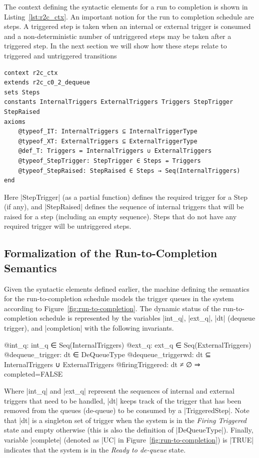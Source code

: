 The context defining the syntactic elements for a run to completion is shown in Listing~\ref{lst:r2c_ctx}. 
An important notion for the run to completion schedule are steps.  
A triggered  step is taken when an internal or external trigger is consumed and a non-deterministic number of untriggered steps may be taken after a triggered step. 
In the next section we will show how these steps relate to triggered and untriggered transitions  

\begin{lstlisting}[language=Event-B, caption = {Context for Run-to-Completion Semantics}, label = {lst:r2c_ctx}]
context r2c_ctx
extends r2c_c0_2_dequeue 
sets Steps
constants InternalTriggers ExternalTriggers Triggers StepTrigger StepRaised
axioms
	@typeof_IT: InternalTriggers ⊆ InternalTriggerType
	@typeof_XT: ExternalTriggers ⊆ ExternalTriggerType
	@def_T: Triggers = InternalTriggers ∪ ExternalTriggers
	@typeof_StepTrigger: StepTrigger ∈ Steps ⇸ Triggers
	@typeof_StepRaised: StepRaised ∈ Steps → Seq(InternalTriggers)
end
\end{lstlisting} 
Here |StepTrigger| (as a partial function) defines the required trigger for a Step (if any), and |StepRaised| defines the sequence of internal triggers that will be raised for a step (including an empty sequence). Steps that do not have any required trigger will be untriggered steps.

\subsection{Formalization of the Run-to-Completion Semantics}
\label{sec:r2c-semantics}
Given the syntactic elements defined earlier, the machine defining the semantics for the run-to-completion schedule models the trigger queues in the system according to Figure~\ref{fig:run-to-completion}. The dynamic status of the run-to-completion schedule is represented by the variables |int_q|, |ext_q|, |dt| (dequeue trigger), and |completion| with the following invariants.
\begin{EventBcode}
	@int_q: int_q ∈ Seq(InternalTriggers)
	@ext_q: ext_q ∈ Seq(ExternalTriggers)
	@dequeue_trigger: dt ∈ DeQueueType
	@dequeue_triggerwd:	dt ⊆ InternalTriggers ∪ ExternalTriggers
	@firingTriggered: dt ≠ ∅ ⇒ completed=FALSE
\end{EventBcode}
Where |int_q| and |ext_q| represent the sequences of internal and external triggers that need to be handled, |dt| keeps track of the trigger that has been removed from the queues (de-queue) to be consumed by a |TriggeredStep|. Note that |dt| is a singleton set of trigger when the system is in the \emph{Firing Triggered} state and empty otherwise (this is also the definition of |DeQueueType|). Finally, variable |complete| (denoted as |UC| in Figure~\ref{fig:run-to-completion}) is |TRUE| indicates that the system is in the \emph{Ready to de-queue} state.

